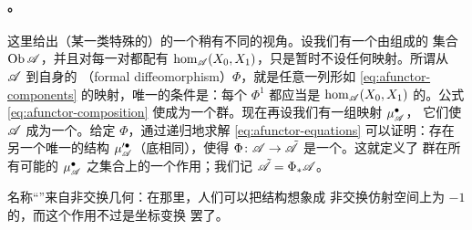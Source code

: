 \paragraph{\trFormalDiffeomorphism。}\label{sub:formal-diffeomorphisms}
这里给出（某一类特殊的）\trAFunctor{}的一个稍有不同的视角。设我们有一个由\trObject{}组成的
集合 $\operatorname{Ob}\mathscr{A}$，并且对每一对\trObject{}都配有\trGraded\trVectorSpace{}%
$\hom_{\mathscr{A}}(X_0,X_1)$，只是暂时不设任何\trComposition{}映射。所谓从 $\mathscr{A}$ 到自身的
\textbf{\trFormalDiffeomorphism}（formal diffeomorphism）$\Phi$，就是任意一列形如
\eqref{eq:afunctor-components} 的映射，唯一的条件是：每个 $\Phi^1$ 都应当是
$\hom_{\mathscr{A}}(X_0,X_1)$ 的\trLinear\trAutomorphism。公式\eqref{eq:afunctor-composition}
使\trFormalDiffeomorphism{}成为一个群。现在再设我们有一组映射 $\mu^{\bullet}_{\mathscr{A}}$，
它们使 $\mathscr{A}$ 成为一个\trNonunital{}\trACategory。给定 $\Phi$，通过递归地求解
\eqref{eq:afunctor-equations} 可以证明：存在另一个唯一的\trAinfty{}结构
$\mu'^{\bullet}_{\mathscr{A}}$（底\trVectorSpace{}相同），使得
$\Phi\colon\mathscr{A}\to\tilde{\mathscr{A}}$ 是一个\trNonunital{}\trAFunctor。这就定义了%
\trFormalDiffeomorphism{}群在所有可能的 $\mu^{\bullet}_{\mathscr{A}}$ 之集合上的一个作用；我们记
$\tilde{\mathscr{A}}=\Phi_{*}\mathscr{A}$。

\begin{remark}\label{thm:formal-diffeo-name}
名称“\trFormalDiffeomorphism”来自非交换几何：在那里，人们可以把\trAinfty{}结构想象成%
\trGraded{}非交换仿射空间上\trDegree{}为 $-1$ 的\trVectorField，而这个作用不过是坐标变换
罢了。
\end{remark}
